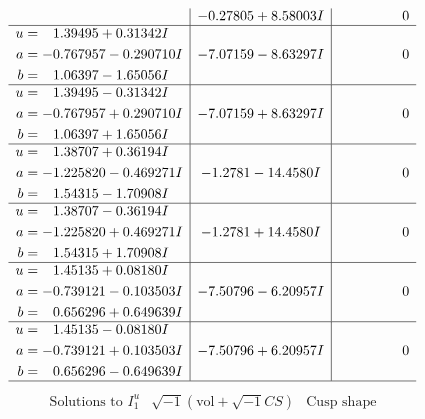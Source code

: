 \documentclass[1p]{elsarticle_modified}
\theoremstyle{definition}
\newcommand{\I}{\sqrt{-1}}
\begin{document}
$$\begin{array}{c|c|c}
 & -0.27805 + 8.58003 I & \phantom{-0.000000 } 0 \\ \hline\begin{aligned}
u &= \phantom{-}1.39495 + 0.31342 I \\
a &= -0.767957 - 0.290710 I \\
b &= \phantom{-}1.06397 - 1.65056 I\end{aligned}
 & -7.07159 - 8.63297 I & \phantom{-0.000000 } 0 \\ \hline\begin{aligned}
u &= \phantom{-}1.39495 - 0.31342 I \\
a &= -0.767957 + 0.290710 I \\
b &= \phantom{-}1.06397 + 1.65056 I\end{aligned}
 & -7.07159 + 8.63297 I & \phantom{-0.000000 } 0 \\ \hline\begin{aligned}
u &= \phantom{-}1.38707 + 0.36194 I \\
a &= -1.225820 - 0.469271 I \\
b &= \phantom{-}1.54315 - 1.70908 I\end{aligned}
 & -1.2781 - 14.4580 I & \phantom{-0.000000 } 0 \\ \hline\begin{aligned}
u &= \phantom{-}1.38707 - 0.36194 I \\
a &= -1.225820 + 0.469271 I \\
b &= \phantom{-}1.54315 + 1.70908 I\end{aligned}
 & -1.2781 + 14.4580 I & \phantom{-0.000000 } 0 \\ \hline\begin{aligned}
u &= \phantom{-}1.45135 + 0.08180 I \\
a &= -0.739121 - 0.103503 I \\
b &= \phantom{-}0.656296 + 0.649639 I\end{aligned}
 & -7.50796 - 6.20957 I & \phantom{-0.000000 } 0 \\ \hline\begin{aligned}
u &= \phantom{-}1.45135 - 0.08180 I \\
a &= -0.739121 + 0.103503 I \\
b &= \phantom{-}0.656296 - 0.649639 I\end{aligned}
 & -7.50796 + 6.20957 I & \phantom{-0.000000 } 0\\
 \hline 
 \end{array}$$\newpage$$\begin{array}{c|c|c}  
\text{Solutions to }I^u_{1}& \I (\text{vol} + \sqrt{-1}CS) & \text{Cusp shape}\\

\end{array}$$
\end{document}
